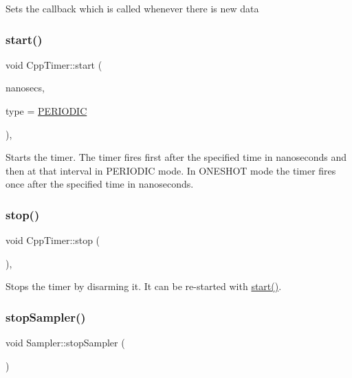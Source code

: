 Sets the callback which is called whenever there is new data \mbox{\label{classCppTimer_a64989025caa3c030c6c397ca76a2d20b}} 
\subsubsection{\texorpdfstring{start()}{start()}}
{\footnotesize\ttfamily void Cpp\+Timer\+::start (\begin{DoxyParamCaption}\item[{long}]{nanosecs,  }\item[{\hyperlink{CppTimer_8h_a110d07ab6a96d7815149d3d95435790a}{cpp\+Timer\+Type\+\_\+t}}]{type = {\ttfamily \hyperlink{CppTimer_8h_a110d07ab6a96d7815149d3d95435790aae4379d044711537d9ce3b3b58c575c58}{P\+E\+R\+I\+O\+D\+IC}} }\end{DoxyParamCaption})\hspace{0.3cm}{\ttfamily [virtual]}, {\ttfamily [inherited]}}

Starts the timer. The timer fires first after the specified time in nanoseconds and then at that interval in P\+E\+R\+I\+O\+D\+IC mode. In O\+N\+E\+S\+H\+OT mode the timer fires once after the specified time in nanoseconds. \mbox{\label{classCppTimer_a4bb95ddee98a536d0818b8f6096bf7e7}} 
\subsubsection{\texorpdfstring{stop()}{stop()}}
{\footnotesize\ttfamily void Cpp\+Timer\+::stop (\begin{DoxyParamCaption}{ }\end{DoxyParamCaption})\hspace{0.3cm}{\ttfamily [virtual]}, {\ttfamily [inherited]}}

Stops the timer by disarming it. It can be re-\/started with \hyperlink{classCppTimer_a64989025caa3c030c6c397ca76a2d20b}{start()}. \mbox{\label{classSampler_af661f48134a6d0f1f2d6080f5025392e}} 
\subsubsection{\texorpdfstring{stop\+Sampler()}{stopSampler()}}
{\footnotesize\ttfamily void Sampler\+::stop\+Sampler (\begin{DoxyParamCaption}{ }\end{DoxyParamCaption})\hspace{0.3cm}{\ttfamily [inline]}}

